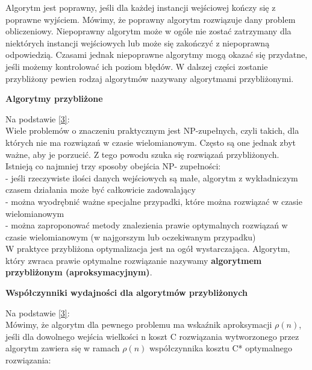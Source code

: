 \documentclass[a4paper, twoside, 12pt, justified]{article}
\begin{document}
	Algorytm jest poprawny, jeśli dla każdej instancji wejściowej kończy się z poprawne wyjściem. Mówimy, że poprawny algorytm rozwiązuje dany problem obliczeniowy. Niepoprawny algorytm może w ogóle nie zostać zatrzymany dla niektórych instancji wejściowych lub	może się zakończyć z niepoprawną odpowiedzią. Czasami jednak niepoprawne algorytmy
	mogą okazać się przydatne, jeśli możemy kontrolować ich poziom błędów. W dalszej części zostanie przybliżony pewien rodzaj algorytmów nazywany algorytmami przybliżonymi.\\
	
	
	\begin{large}
		\begin{center}
			\textbf{Algorytmy przybliżone}
		\end{center}
	\end{large}

	Na podstawie \hyperlink{algorithm}{[3]}:\\
	Wiele problemów o znaczeniu praktycznym jest NP-zupełnych, czyli takich, dla których nie ma rozwiązań w czasie wielomianowym. Często są one jednak zbyt ważne, aby je porzucić. Z tego powodu szuka się rozwiązań przybliżonych. Istnieją co najmniej trzy sposoby obejścia NP- zupełności:\\
	- jeśli rzeczywiste ilości danych wejściowych są małe,
	algorytm z wykładniczym czasem działania może być całkowicie zadowalający\\
	- można wyodrębnić ważne specjalne przypadki, które można rozwiązać w czasie wielomianowym\\
	- można zaproponować metody znalezienia prawie optymalnych rozwiązań w czasie wielomianowym (w najgorszym lub oczekiwanym przypadku)\\
	
	W praktyce przybliżona optymalizacja jest na ogół wystarczająca. Algorytm, który zwraca prawie optymalne
	rozwiązanie nazywamy \textbf{algorytmem przybliżonym (aproksymacyjnym)}.\\
	
	\begin{large}
		\begin{center}
			\textbf{Współczynniki wydajności dla algorytmów przybliżonych}
		\end{center}
	\end{large}
	
	Na podstawie \hyperlink{algorithm}{[3]}:\\
	
	Mówimy, że algorytm dla pewnego problemu ma wskaźnik aproksymacji $\rho(n)$, jeśli dla dowolnego wejścia wielkości n koszt C rozwiązania wytworzonego przez algorytm zawiera się
	w ramach $\rho(n)$ współczynnika kosztu C* optymalnego rozwiązania:
	
\end{document}
